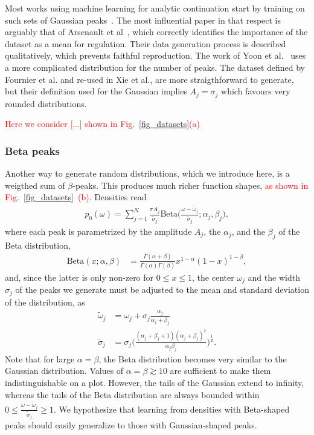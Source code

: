 \documentclass[notitlepage, 11pt, nofootinbib]{revtex4-1}
\begin{document}
Most works using machine learning for analytic continuation start by training on such sets of Gaussian peaks~\cite{Arsenault2017, Yoon2018, Xie2019, Fournier2020}. The most influential paper in that respect is arguably that of Arsenault et al~\cite{Arsenault2017}, which correctly identifies the importance of the dataset as a mean for regulation. 
Their data generation process is described qualitatively, which prevents faithful reproduction. The work of Yoon et al.~\cite{Yoon2018} uses a more complicated distribution for the number of peaks. The dataset defined by Fournier et al.\cite{Fournier2020} and re-used in Xie et al.\cite{Xie2019}, are more straigthforward to generate, but their definition used for the Gaussian implies $A_j=\sigma_j$ which favours very rounded distributions.

\textcolor{red}{Here we consider [...] shown in Fig.~\ref{fig_datasets}(a)}


\subsubsection{Beta peaks}
Another way to generate random distributions, which we introduce here, is a weigthed sum of $\beta$-peaks. This produces much richer function shapes, \textcolor{red}{as shown in Fig.~\ref{fig_datasets}~(b)}. Densities read
\begin{align}
p_0(\omega)
=
\sum_{j=1}^{N} 
\frac{\pi A_j}{\tilde{\sigma}_j}
\text{Beta}\bigg(
\frac{\omega-\tilde{\omega}_j}{\tilde{\sigma}_j}
;\alpha_j,\beta_j
\bigg),
\end{align}
where each peak is parametrized by the amplitude $A_j$, the $\alpha_j$, and the $\beta_j$ of the Beta distribution,
\begin{align}
\text{Beta}(x;\alpha,\beta) 
&=
\frac{\Gamma(\alpha+\beta)}{\Gamma(\alpha)\Gamma(\beta)} x^{1-\alpha}(1-x)^{1-\beta},
\end{align}
and, since the latter is only non-zero for $0\leq x\leq 1$, the center $\omega_j$ and the width $\sigma_j$ of the peaks we generate must be adjusted to the mean and standard deviation of the distribution, as
\begin{align}
\tilde{\omega}_j
&=
\omega_j+\sigma_j
\frac{\alpha_j}{\alpha_j+\beta_j}
\\
\tilde{\sigma}_j
&=
\sigma_j
\bigg(
\frac
{(\alpha_j+\beta_j+1)(\alpha_j+\beta_j)^2}
{\alpha_j\beta_j}
\bigg)^{\frac{1}{2}}.
\end{align}
Note that for large $\alpha=\beta$, the Beta distribution becomes very similar to the Gaussian distribution. Values of $\alpha=\beta\gtrsim 10$ are sufficient to make them indistinguishable on a plot. However, the tails of the Gaussian extend to infinity, whereas the tails of the Beta distribution are always bounded within $0 \leq \frac{\omega-\tilde{\omega}_j}{\tilde{\sigma}_j} \geq 1$. We hypothesize that learning from densities with Beta-shaped peaks should easily generalize to those with Gaussian-shaped peaks.
\end{document}
